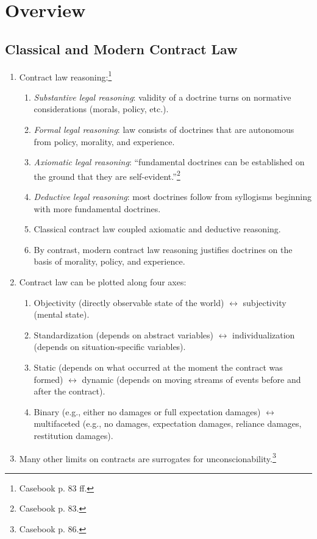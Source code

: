 \section{Overview}

\subsection{Classical and Modern Contract Law}

\begin{enumerate}
    \item Contract law reasoning:\footnote{Casebook p. 83 
    ff.}
    \begin{enumerate}
        \item \emph{Substantive legal reasoning}: validity of a doctrine turns 
        on normative considerations (morals, policy, etc.).
        \item \emph{Formal legal reasoning}: law consists of doctrines that 
        are autonomous from policy, morality, and experience.
        \item \emph{Axiomatic legal reasoning}: ``fundamental doctrines can be 
        established on the ground that they are 
        self-evident.''\footnote{Casebook p. 83.}
        \item \emph{Deductive legal reasoning}: most doctrines follow from 
        syllogisms beginning with more fundamental doctrines.
        \item Classical contract law coupled axiomatic and deductive 
        reasoning.
        \item By contrast, modern contract law reasoning justifies doctrines 
        on the basis of morality, policy, and experience.
    \end{enumerate}
    \item Contract law can be plotted along four axes:
    \begin{enumerate}
        \item Objectivity (directly observable state of the world) 
        $\leftrightarrow$ subjectivity (mental state).
        \item Standardization (depends on abstract variables) 
        $\leftrightarrow$ individualization (depends on situation-specific 
        variables).
        \item Static (depends on what occurred at the moment the contract was 
        formed) $\leftrightarrow$ dynamic (depends on moving streams of events 
        before and after the contract).
        \item Binary (e.g., either no damages or full expectation damages) 
        $\leftrightarrow$ multifaceted (e.g., no damages, expectation damages, 
        reliance damages, restitution damages).
    \end{enumerate}
    \item Many other limits on contracts are surrogates for 
    unconscionability.\footnote{Casebook p. 86.}
\end{enumerate}

